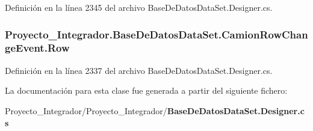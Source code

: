 Definición en la línea 2345 del archivo Base\-De\-Datos\-Data\-Set.\-Designer.\-cs.

\subsubsection[{Row}]{ Proyecto\-\_\-\-Integrador.\-Base\-De\-Datos\-Data\-Set.\-Camion\-Row\-Change\-Event.\-Row\hspace{0.3cm}{\ttfamily [get]}}\label{class_proyecto___integrador_1_1_base_de_datos_data_set_1_1_camion_row_change_event_ad405e5de4fa3ffa914a272014105a3e0}


Definición en la línea 2337 del archivo Base\-De\-Datos\-Data\-Set.\-Designer.\-cs.



La documentación para esta clase fue generada a partir del siguiente fichero\-:\begin{DoxyCompactItemize}
\item 
Proyecto\-\_\-\-Integrador/\-Proyecto\-\_\-\-Integrador/{\bf Base\-De\-Datos\-Data\-Set.\-Designer.\-cs}\end{DoxyCompactItemize}
